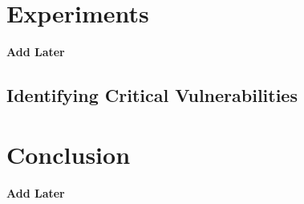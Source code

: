 \documentclass[sigconf]{aamas}  %
\theoremstyle{definition}
\theoremstyle{definition}
\begin{document}










\section{Experiments}\label{sec:expts}
\textbf{Add Later}

\subsection{Identifying Critical Vulnerabilities}

\section{Conclusion}\label{sec:conclusion}
\textbf{Add Later}




\end{document}
